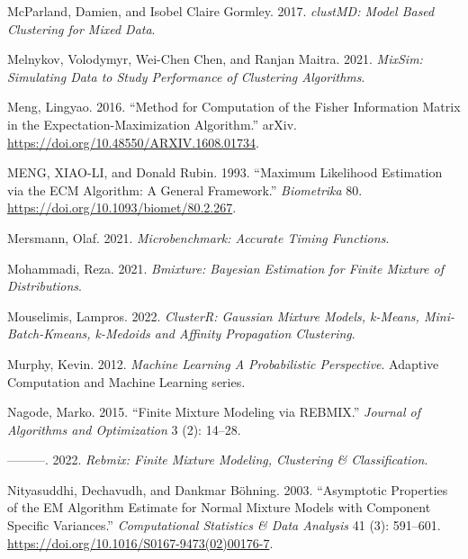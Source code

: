 \begin{CSLReferences}{1}{0}
\leavevmode{}%
McParland, Damien, and Isobel Claire Gormley. 2017. \emph{clustMD: Model Based Clustering for Mixed Data}.

\leavevmode{}%
Melnykov, Volodymyr, Wei-Chen Chen, and Ranjan Maitra. 2021. \emph{MixSim: Simulating Data to Study Performance of Clustering Algorithms}.

\leavevmode{}%
Meng, Lingyao. 2016. {``Method for Computation of the Fisher Information Matrix in the Expectation-Maximization Algorithm.''} arXiv. \url{https://doi.org/10.48550/ARXIV.1608.01734}.

\leavevmode{}%
MENG, XIAO-LI, and Donald Rubin. 1993. {``Maximum {Likelihood Estimation} via the {ECM Algorithm}: {A General Framework}.''} \emph{Biometrika} 80. \url{https://doi.org/10.1093/biomet/80.2.267}.

\leavevmode{}%
Mersmann, Olaf. 2021. \emph{Microbenchmark: Accurate Timing Functions}.

\leavevmode{}%
Mohammadi, Reza. 2021. \emph{Bmixture: Bayesian Estimation for Finite Mixture of Distributions}.

\leavevmode{}%
Mouselimis, Lampros. 2022. \emph{ClusterR: Gaussian Mixture Models, k-Means, Mini-Batch-Kmeans, k-Medoids and Affinity Propagation Clustering}.

\leavevmode{}%
Murphy, Kevin. 2012. \emph{Machine {Learning A Probabilistic Perspective}}. {Adaptive Computation and Machine Learning series}.

\leavevmode{}%
Nagode, Marko. 2015. {``Finite Mixture Modeling via REBMIX.''} \emph{Journal of Algorithms and Optimization} 3 (2): 14--28.

\leavevmode{}%
---------. 2022. \emph{Rebmix: Finite Mixture Modeling, Clustering \& Classification}.

\leavevmode{}%
Nityasuddhi, Dechavudh, and Dankmar Böhning. 2003. {``Asymptotic Properties of the {EM} Algorithm Estimate for Normal Mixture Models with Component Specific Variances.''} \emph{Computational Statistics \& Data Analysis} 41 (3): 591--601. \url{https://doi.org/10.1016/S0167-9473(02)00176-7}.


\end{CSLReferences}
